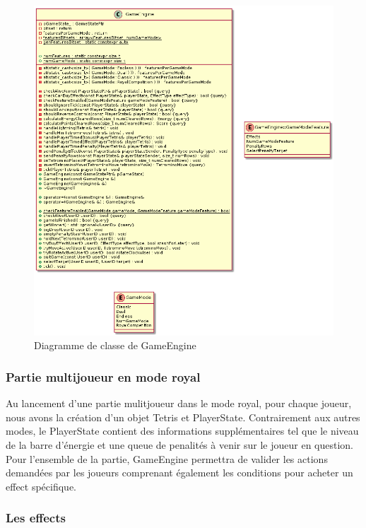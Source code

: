 \documentclass{article}
\begin{document}
\begin{figure}[H]
	\centering
	 \includegraphics[scale=0.5]{../../res/uml/class/GameEngineClass.png}
	 \caption{Diagramme de classe de GameEngine}
	 \label{fig:GameEngine}
\end{figure}

\subsubsection{Partie multijoueur en mode royal}

Au lancement d'une partie mulitjoueur dans le mode royal, pour chaque joueur, nous avons la création d'un objet Tetris et PlayerState. Contrairement aux autres modes, le PlayerState contient des informations supplémentaires tel que le niveau de la barre d'énergie et une queue de penalités à venir sur le joueur en question. Pour l'ensemble de la partie, GameEngine permettra de valider les actions demandées par les joueurs comprenant également les conditions pour acheter un effect spécifique.
\subsubsection*{Les effects}
\end{document}
